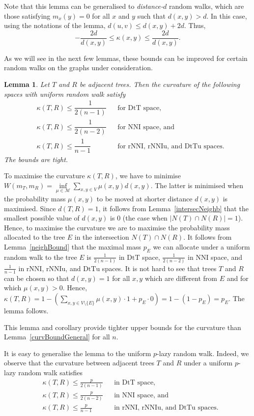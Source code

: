 \documentclass{amsart}
\newtheorem{lemma}{Lemma}
\newcommand{\nni}{\mathrm{NNI}}
\newcommand{\rnni}{\mathrm{rNNI}}
\newcommand{\rnniu}{\mathrm{rNNIu}}
\newcommand{\mdts}{\mathrm{DtT}}
\newcommand{\mdtsu}{\mathrm{DtTu}}
\newcommand{\M}{\mathcal{M}}
\begin{document}
Note that this lemma can be generalised to {\em distance-$d$} random walks, which are those satisfying $m_x(y) = 0$ for all $x$ and $y$ such that $d(x,y) > d$.
In this case, using the notations of the lemma, $d(u,v) \leq d(x,y) + 2d$.
Thus,
\[
-\dfrac{2d}{d(x,y)} \leq \kappa(x,y) \leq \dfrac{2d}{d(x,y)}.
\]

As we will see in the next few lemmas, these bounds can be improved for certain random walks on the graphs under consideration.

\begin{lemma}\label{uniformUpper}
Let $T$ and $R$ be adjacent trees.
Then the curvature of the following spaces with uniform random walk satisfy
\begin{align*}
& \kappa(T,R) \leq \dfrac{1}{2(n-1)}	&& \mbox{for $\mdts$ space,}\\
& \kappa(T,R) \leq \dfrac{1}{2(n-2)}	&& \mbox{for $\nni$ space, and}\\
& \kappa(T,R) \leq \dfrac{1}{n-1}	&& \mbox{for $\rnni$, $\rnniu$, and $\mdtsu$ spaces.}
\end{align*}
The bounds are tight.
\end{lemma}

\proof
To maximise the curvature $\kappa(T,R)$, we have to minimise $W(m_T,m_R) = \inf\limits_{\mu\in\M} \sum\limits_{x,y\in V}\mu(x,y) d(x,y)$.
The latter is minimised when the probability mass $\mu(x,y)$ to be moved at shorter distance $d(x,y)$ is maximised.
Since $d(T,R) = 1$, it follows from Lemma~\ref{intersecNeighb} that the smallest possible value of $d(x,y)$ is $0$ (the case when $|N(T) \cap N(R)| = 1$).
Hence, to maximise the curvature we are to maximise the probability mass allocated to the tree $E$ in the intersection $N(T) \cap N(R)$.
It follows from Lemma~\ref{neighBound} that the maximal mass $p_E$ we can allocate under a uniform random walk to the tree $E$ is $\frac{1}{2(n-1)}$ in $\mdts$ space, $\frac{1}{2(n-2)}$ in $\nni$ space, and $\frac{1}{n-1}$ in $\rnni$, $\rnniu$, and $\mdtsu$ spaces.
It is not hard to see that trees $T$ and $R$ can be chosen so that $d(x,y) = 1$ for all $x,y$ which are different from $E$ and for which $\mu(x,y) > 0$.
Hence, $\kappa(T, R) = 1 - \left(\sum\limits_{x,y\in V\setminus\{E\}}\mu(x,y)\cdot 1 + p_E \cdot 0\right) = 1 - (1-p_E) = p_E$.
The lemma follows.
\endproof

This lemma and corollary provide tighter upper bounds for the curvature than Lemma~\ref{curvBoundGeneral} for all $n$.

It is easy to generalise the lemma to the uniform $p$-lazy random walk.
Indeed, we observe that the curvature between adjacent trees $T$ and $R$ under a uniform $p$-lazy random walk satisfies
\begin{align*}
& \kappa(T,R) \leq \frac{p}{2(n-1)}	&& \mbox{in $\mdts$ space,}\\
& \kappa(T,R) \leq \frac{p}{2(n-2)}	&& \mbox{in $\nni$ space, and}\\
& \kappa(T,R) \leq \frac{p}{n-1}		&& \mbox{in $\rnni$, $\rnniu$, and $\mdtsu$ spaces.}
\end{align*}
\end{document}
